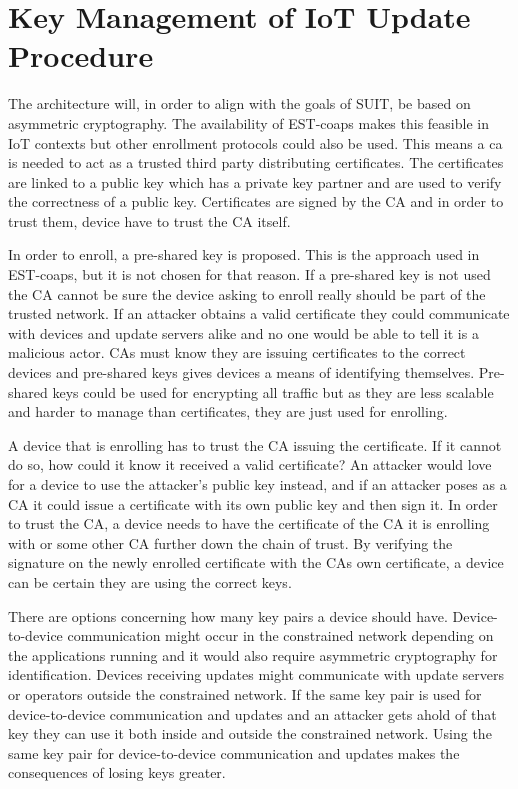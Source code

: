\documentclass[0-thesis.tex]{subfiles}
\begin{document}
\section{Key Management of IoT Update Procedure}
\label{sec:key-management}
The architecture will, in order to align with the goals of SUIT, be based on asymmetric
cryptography. The availability of EST-coaps makes this feasible in IoT contexts but other
enrollment protocols could also be used. This means a \gls{ca} is needed to act as a
trusted third party distributing certificates. The certificates are linked to a public key
which has a private key partner and are used to verify the correctness of a public key.
Certificates are signed by the CA and in order to trust them, device have to trust the CA
itself.

In order to enroll, a pre-shared key is proposed. This is the approach used in EST-coaps,
but it is not chosen for that reason. If a pre-shared key is not used the CA cannot be
sure the device asking to enroll really should be part of the trusted network. If an
attacker obtains a valid certificate they could communicate with devices and update
servers alike and no one would be able to tell it is a malicious actor. CAs must know they
are issuing certificates to the correct devices and pre-shared keys gives devices a means
of identifying themselves. Pre-shared keys could be used for encrypting all traffic but as
they are less scalable and harder to manage than certificates, they are just used for
enrolling.

A device that is enrolling has to trust the CA issuing the certificate. If it cannot do
so, how could it know it received a valid certificate? An attacker would love for a device
to use the attacker's public key instead, and if an attacker poses as a CA it could issue
a certificate with its own public key and then sign it. In order to trust the CA, a device
needs to have the certificate of the CA it is enrolling with or some other CA further down
the chain of trust. By verifying the signature on the newly enrolled certificate with the
CAs own certificate, a device can be certain they are using the correct keys.

There are options concerning how many key pairs a device should have. Device-to-device
communication might occur in the constrained network depending on the applications running
and it would also require asymmetric cryptography for identification. Devices receiving
updates might communicate with update servers or operators outside the constrained
network. If the same key pair is used for device-to-device communication and updates and
an attacker gets ahold of that key they can use it both inside and outside the constrained
network. Using the same key pair for device-to-device communication and updates makes the
consequences of losing keys greater. 
\end{document}
